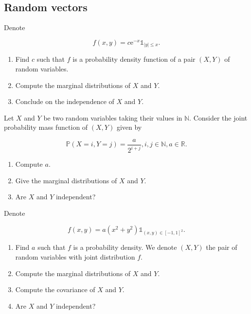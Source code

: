 \begin{center}
    \section*{Random vectors}
\end{center}

\begin{Exercise}
    Denote

$$
f(x, y)=c \mathrm{e}^{-x} \mathbb{1}_{|y| \leq x} .
$$

\begin{enumerate}
  \item Find $c$ such that $f$ is a probability density function of a pair $(X, Y)$ of random variables.

  \item Compute the marginal distributions of $X$ and $Y$.

  \item Conclude on the independence of $X$ and $Y$. 

\end{enumerate}


\end{Exercise}

\begin{Exercise}
    Let $X$ and $Y$ be two random variables taking their values in $\mathbb{N}$. Consider the joint probability mass function of $(X, Y)$ given by

$$
\mathbb{P}(X=i, Y=j)=\frac{a}{2^{i+j}}, i, j \in \mathbb{N}, a \in \mathbb{R} .
$$

\begin{enumerate}
  \item Compute $a$.

  \item Give the marginal distributions of $X$ and $Y$.

  \item Are $X$ and $Y$ independent?

\end{enumerate}
\end{Exercise}

\begin{Exercise}
    Denote

$$
f(x, y)=a\left(x^{2}+y^{2}\right) \mathbb{1}_{(x, y) \in[-1,1]^{2}} .
$$

\begin{enumerate}
  \item Find $a$ such that $f$ is a probability density. We denote $(X, Y)$ the pair of random variables with joint distribution $f$.

  \item Compute the marginal distributions of $X$ and $Y$.

  \item Compute the covariance of $X$ and $Y$.

  \item Are $X$ and $Y$ independent?

\end{enumerate}
\end{Exercise}

